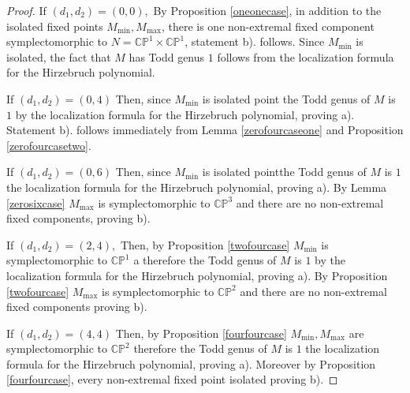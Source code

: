 \documentclass[10pt,a4paper]{amsart}
\begin{document}
\begin{proof}

If $(d_1,d_2) = (0,0),$ By Proposition \ref{oneonecase}, in addition to the isolated fixed points $M_{\min},M_{\max}$, there is one non-extremal fixed component symplectomorphic to $N=\mathbb{CP}^1 \times \mathbb{CP}^1$, statement b). follows. Since $M_{\min}$ is isolated, the fact that $M$ has Todd genus $1$ follows from the localization formula for the Hirzebruch polynomial. 

If $(d_1,d_2) = (0,4)$ Then, since $M_{\min}$ is isolated point the Todd genus of $M$ is $1$ by the localization formula for the Hirzebruch polynomial, proving a). Statement b).  follows immediately from Lemma \ref{zerofourcaseone} and Proposition \ref{zerofourcasetwo}. 

If $(d_1,d_2) = (0,6)$ Then, since $M_{\min}$ is isolated pointthe Todd genus of $M$ is $1$ the localization formula for the Hirzebruch polynomial, proving a). By Lemma \ref{zerosixcase} $M_{\max}$ is symplectomorphic to $\mathbb{CP}^3$ and there are no non-extremal fixed components, proving b).


If $(d_1,d_2) =(2,4),$ Then, by Proposition \ref{twofourcase} $M_{\min}$ is symplectomorphic to $\mathbb{CP}^1$ a therefore the Todd genus of $M$ is $1$ by the localization formula for the Hirzebruch polynomial, proving a).  By Proposition  \ref{twofourcase}  $M_{\max}$ is symplectomorphic to $\mathbb{CP}^2$  and there are no non-extremal fixed components proving b).



If  $(d_1,d_2) =(4,4)$ Then, by Proposition \ref{fourfourcase} $M_{\min},M_{\max}$ are symplectomorphic to $\mathbb{CP}^2$  therefore  the Todd genus of $M$ is $1$ the localization formula for the Hirzebruch polynomial, proving a). Moreover by Proposition \ref{fourfourcase}, every non-extremal fixed point isolated proving b). 
\end{proof}
\end{document}
